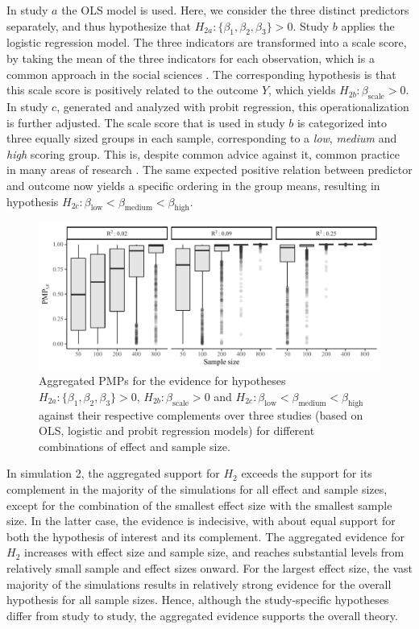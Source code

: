 \documentclass[11pt,reqno]{article}
\begin{document}
In study $a$ the OLS model is used. Here, we consider the three distinct predictors separately, and thus hypothesize that $H_{2a}: \{\beta_1, \beta_2, \beta_3\} > 0$.
Study $b$ applies the logistic regression model. The three indicators are transformed into a scale score, by taking the mean of the three indicators for each observation, which is a common approach in the social sciences \autocite[e.g.,][]{bauer_discrepancy_2016}.
The corresponding hypothesis is that this scale score is positively related to the outcome $Y$, which yields $H_{2b}: \beta_{\text{scale}} > 0$.
In study $c$, generated and analyzed with probit regression, this operationalization is further adjusted.
The scale score that is used in study $b$ is categorized into three equally sized groups in each sample, corresponding to a \textit{low}, \textit{medium} and \textit{high} scoring group.
This is, despite common advice against it, common practice in many areas of research \autocite[e.g.,][]{bennette_against_2012, decoster_best_2011}.
The same expected positive relation between predictor and outcome now yields a specific ordering in the group means, resulting in hypothesis $H_{2c}: \beta_{\text{low}} < \beta_{\text{medium}} < \beta_{\text{high}}$.


\begin{figure}[ht]
   \centerline{\includegraphics[width=14cm]{r-files-bes-klugkist-volker-2022/Figures/sim2_box}}
 \caption{Aggregated PMPs for the evidence for hypotheses $H_{2a}: \{\beta_1, \beta_2, \beta_3\} > 0$, $H_{2b}: \beta_{\text{scale}} > 0$ and $H_{2c}: \beta_{\text{low}} < \beta_{\text{medium}} < \beta_{\text{high}}$ against their respective complements over three studies (based on OLS, logistic and probit regression models) for different combinations of effect and sample size.}
\label{sim2_box}
\end{figure}


In simulation 2, the aggregated support for $H_2$ exceeds the support for its complement in the majority of the simulations for all effect and sample sizes, except for the combination of the smallest effect size with the smallest sample size.
In the latter case, the evidence is indecisive, with about equal support for both the hypothesis of interest and its complement.
The aggregated evidence for $H_2$ increases with effect size and sample size, and reaches substantial levels from relatively small sample and effect sizes onward.
For the largest effect size, the vast majority of the simulations results in relatively strong evidence for the overall hypothesis for all sample sizes.
Hence, although the study-specific hypotheses differ from study to study, the aggregated evidence supports the overall theory.
\end{document}
